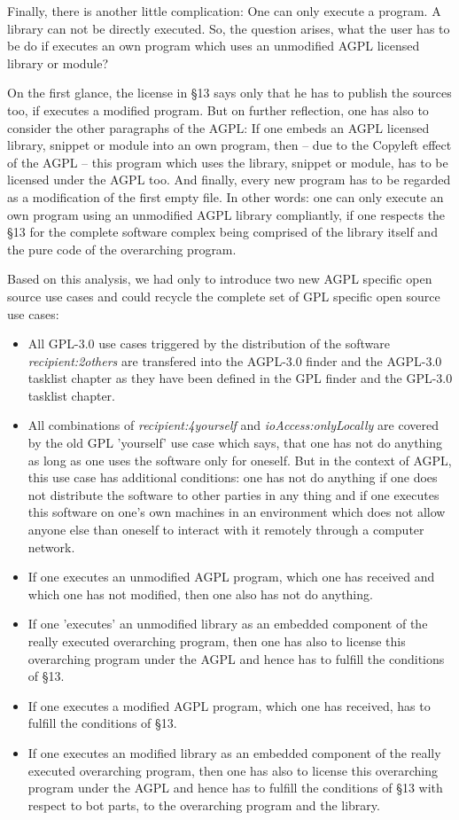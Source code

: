 Finally, there is another little complication: One can only execute a program. A
library can not be directly executed. So, the question arises, what the user has
to be do if executes an own program which uses an unmodified AGPL licensed
library or module?

On the first glance, the license in §13 says only that he has to publish the
sources too, if executes a modified program. But on further reflection, one has
also to consider the other paragraphs of the AGPL: If one embeds an AGPL
licensed library, snippet or module into an own program, then -- due to the
Copyleft effect of the AGPL -- this program which uses the library, snippet or
module, has to be licensed under the AGPL too. And finally, every new program
has to be regarded as a modification of the first empty file. In other words:
one can only execute an own program using an unmodified AGPL library compliantly,
if one respects the §13 for the complete software complex being comprised of the
library itself and the pure code of the overarching program.

Based on this analysis, we had only to introduce two new AGPL specific open
source use cases and could recycle the complete set of GPL specific open source
use cases:

\begin{itemize}
  \item All GPL-3.0 use cases triggered by the distribution of the software
  \emph{recipient:2others} are transfered into the AGPL-3.0 finder and the
  AGPL-3.0 tasklist chapter as they have been defined in the GPL finder and the
  GPL-3.0 tasklist chapter.
  \item All combinations of \emph{recipient:4yourself} and
  \emph{ioAccess:onlyLocally} are covered by the old GPL 'yourself' use case
  which says, that one has not do anything as long as one uses the software only
  for oneself. But in the context of AGPL, this use case has additional
  conditions: one has not do anything if one does not distribute the software to
  other parties in any thing and if one executes this software on one's own
  machines in an environment which does not allow anyone else than
  oneself to interact with it remotely through a computer network.
  \item If one executes an unmodified AGPL program, which one has received and
  which one has not modified, then one also has not do anything.
  \item If one 'executes' an unmodified library as an embedded component of the
  really executed overarching program, then one has also to license this
  overarching program under the AGPL and hence has to fulfill the conditions of §13.
  \item If one executes a modified AGPL program, which one has received, has to
  fulfill the conditions of §13.
  \item If one executes an modified library as an embedded component of the
  really executed overarching program, then one has also to license this
  overarching program under the AGPL and hence has to fulfill the conditions of
  §13 with respect to bot parts, to the overarching program and the library.
\end{itemize}

